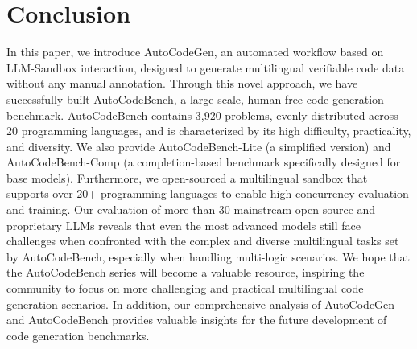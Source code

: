 
\section{Conclusion}
\label{sec:conclusion}

In this paper, we introduce AutoCodeGen, an automated workflow based on LLM-Sandbox interaction, designed to generate multilingual verifiable code data without any manual annotation. Through this novel approach, we have successfully built AutoCodeBench, a large-scale, human-free code generation benchmark. AutoCodeBench contains 3,920 problems, evenly distributed across 20 programming languages, and is characterized by its high difficulty, practicality, and diversity. We also provide AutoCodeBench-Lite (a simplified version) and AutoCodeBench-Comp (a completion-based benchmark specifically designed for base models). Furthermore, we open-sourced a multilingual sandbox that supports over 20+ programming languages to enable high-concurrency evaluation and training. Our evaluation of more than 30 mainstream open-source and proprietary LLMs reveals that even the most advanced models still face challenges when confronted with the complex and diverse multilingual tasks set by AutoCodeBench, especially when handling multi-logic scenarios. We hope that the AutoCodeBench series will become a valuable resource, inspiring the community to focus on more challenging and practical multilingual code generation scenarios. In addition, our comprehensive analysis of AutoCodeGen and AutoCodeBench provides valuable insights for the future development of code generation benchmarks.










